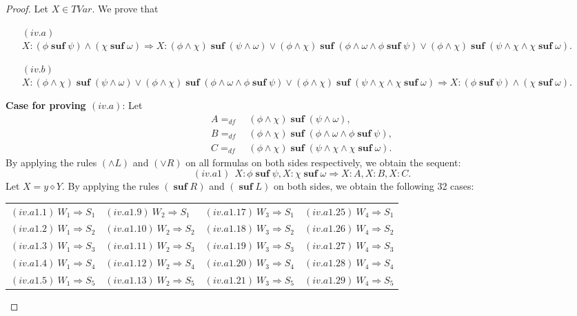 \documentclass[manuscript,screen]{acmart}
\newcommand{\dddef}[0]{=_{df}}
\newcommand{\cat}[0]{\diamond}
\DeclareMathOperator{\osuf}{\mathbf{suf}}
\newcommand{\TVar}[0]{\textit{TVar}}
\begin{document}
\begin{proof}
Let $X\in \TVar$. We prove that 
\begin{enumerate}
\item[$(iv.a)$] $X : (\phi\osuf \psi)\wedge (\chi\osuf \omega)\Rightarrow X : (\phi\wedge \chi)\osuf (\psi\wedge \omega)\vee (\phi\wedge \chi)\osuf(\phi\wedge \omega\wedge \phi\osuf \psi)\vee (\phi\wedge \chi)\osuf (\psi\wedge \chi\wedge \chi\osuf\omega)$.
\item[$(iv.b)$] $X : (\phi\wedge \chi)\osuf (\psi\wedge \omega)\vee (\phi\wedge \chi)\osuf(\phi\wedge \omega\wedge \phi\osuf \psi)\vee (\phi\wedge \chi)\osuf (\psi\wedge \chi\wedge \chi\osuf\omega)\Rightarrow X : (\phi\osuf \psi)\wedge (\chi\osuf \omega)$. 
\end{enumerate}

\textbf{Case for proving $(iv.a)$}: 
Let 
$$
\begin{aligned}
A \dddef&\ (\phi\wedge \chi)\osuf (\psi\wedge \omega),\\
B \dddef&\ (\phi\wedge \chi)\osuf(\phi\wedge \omega\wedge \phi\osuf \psi),\\
C \dddef&\ (\phi\wedge \chi)\osuf (\psi\wedge \chi\wedge \chi\osuf\omega). 
\end{aligned}
$$
By applying the rules $(\wedge L)$ and $(\vee R)$ on all formulas on both sides respectively, we obtain the sequent:
$$
(iv.a1)\ \ X : \phi\osuf \psi, X : \chi\osuf\omega\Rightarrow X : A , X : B , X : C. 
$$
Let $X = y\cat Y$. By applying the rules $(\osuf R)$ and $(\osuf L)$ on both sides, we obtain the following 32 cases: 
\begin{center}
\begin{tabular}{l l l l}
$(iv.a1.1)\ W_1\Rightarrow S_1$
& 
$(iv.a1.9)\ W_2\Rightarrow S_1$
& 
$(iv.a1.17)\ W_3\Rightarrow S_1$
& 
$(iv.a1.25)\ W_4\Rightarrow S_1$
\\
$(iv.a1.2)\ W_1\Rightarrow S_2$
& 
$(iv.a1.10)\ W_2\Rightarrow S_2$
& 
$(iv.a1.18)\ W_3\Rightarrow S_2$
& 
$(iv.a1.26)\ W_4\Rightarrow S_2$
\\
$(iv.a1.3)\ W_1\Rightarrow S_3$
& 
$(iv.a1.11)\ W_2\Rightarrow S_3$
& 
$(iv.a1.19)\ W_3\Rightarrow S_3$
& 
$(iv.a1.27)\ W_4\Rightarrow S_3$
\\
$(iv.a1.4)\ W_1\Rightarrow S_4$
& 
$(iv.a1.12)\ W_2\Rightarrow S_4$
& 
$(iv.a1.20)\ W_3\Rightarrow S_4$
& 
$(iv.a1.28)\ W_4\Rightarrow S_4$
\\
$(iv.a1.5)\ W_1\Rightarrow S_5$
& 
$(iv.a1.13)\ W_2\Rightarrow S_5$
& 
$(iv.a1.21)\ W_3\Rightarrow S_5$
& 
$(iv.a1.29)\ W_4\Rightarrow S_5$

\end{tabular}
\end{center}
\end{proof}
\end{document}
